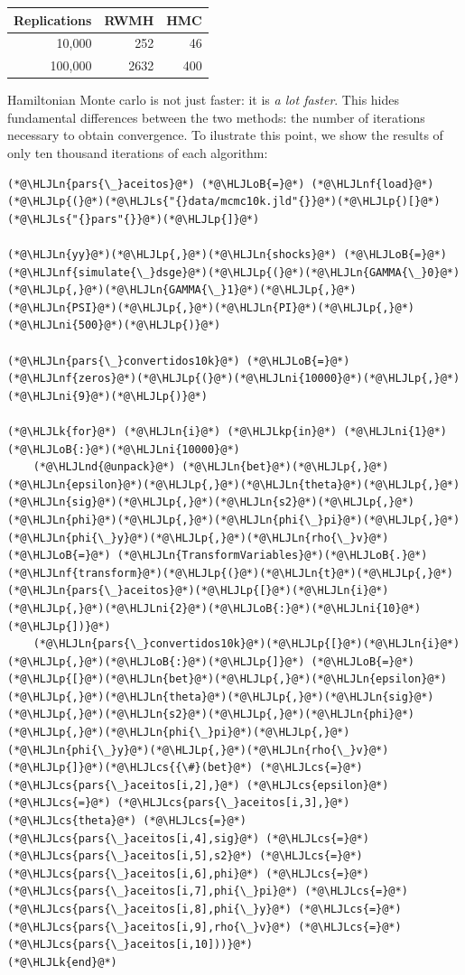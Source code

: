 \documentclass[12pt,a4paper]{article}
\newcommand{\HLJLk}[1]{\textcolor[RGB]{148,91,176}{\textbf{#1}}}
\newcommand{\HLJLkp}[1]{\textcolor[RGB]{148,91,176}{\textbf{#1}}}
\newcommand{\HLJLn}[1]{#1}
\newcommand{\HLJLnd}[1]{\textcolor[RGB]{214,102,97}{#1}}
\newcommand{\HLJLnf}[1]{\textcolor[RGB]{66,102,213}{#1}}
\newcommand{\HLJLs}[1]{\textcolor[RGB]{201,61,57}{#1}}
\newcommand{\HLJLni}[1]{\textcolor[RGB]{59,151,46}{#1}}
\newcommand{\HLJLoB}[1]{\textcolor[RGB]{102,102,102}{\textbf{#1}}}
\newcommand{\HLJLp}[1]{#1}
\newcommand{\HLJLcs}[1]{\textcolor[RGB]{153,153,119}{\textit{#1}}}
\begin{document}
\begin{tabular}
{r | r | r}
Replications & RWMH & HMC \\
\hline
10,000 & 252 & 46 \\
100,000 & 2632 & 400 \\
\end{tabular}
Hamiltonian Monte carlo is not just faster: it is \emph{a lot faster}. This hides fundamental differences between the two methods: the number of iterations necessary to obtain convergence. To ilustrate this point, we show the results of only ten thousand iterations of each algorithm:


\begin{lstlisting}
(*@\HLJLn{pars{\_}aceitos}@*) (*@\HLJLoB{=}@*) (*@\HLJLnf{load}@*)(*@\HLJLp{(}@*)(*@\HLJLs{"{}data/mcmc10k.jld"{}}@*)(*@\HLJLp{)[}@*)(*@\HLJLs{"{}pars"{}}@*)(*@\HLJLp{]}@*)

(*@\HLJLn{yy}@*)(*@\HLJLp{,}@*)(*@\HLJLn{shocks}@*) (*@\HLJLoB{=}@*) (*@\HLJLnf{simulate{\_}dsge}@*)(*@\HLJLp{(}@*)(*@\HLJLn{GAMMA{\_}0}@*)(*@\HLJLp{,}@*)(*@\HLJLn{GAMMA{\_}1}@*)(*@\HLJLp{,}@*)(*@\HLJLn{PSI}@*)(*@\HLJLp{,}@*)(*@\HLJLn{PI}@*)(*@\HLJLp{,}@*)(*@\HLJLni{500}@*)(*@\HLJLp{)}@*)

(*@\HLJLn{pars{\_}convertidos10k}@*) (*@\HLJLoB{=}@*) (*@\HLJLnf{zeros}@*)(*@\HLJLp{(}@*)(*@\HLJLni{10000}@*)(*@\HLJLp{,}@*)(*@\HLJLni{9}@*)(*@\HLJLp{)}@*)

(*@\HLJLk{for}@*) (*@\HLJLn{i}@*) (*@\HLJLkp{in}@*) (*@\HLJLni{1}@*)(*@\HLJLoB{:}@*)(*@\HLJLni{10000}@*)
    (*@\HLJLnd{@unpack}@*) (*@\HLJLn{bet}@*)(*@\HLJLp{,}@*)(*@\HLJLn{epsilon}@*)(*@\HLJLp{,}@*)(*@\HLJLn{theta}@*)(*@\HLJLp{,}@*)(*@\HLJLn{sig}@*)(*@\HLJLp{,}@*)(*@\HLJLn{s2}@*)(*@\HLJLp{,}@*)(*@\HLJLn{phi}@*)(*@\HLJLp{,}@*)(*@\HLJLn{phi{\_}pi}@*)(*@\HLJLp{,}@*)(*@\HLJLn{phi{\_}y}@*)(*@\HLJLp{,}@*)(*@\HLJLn{rho{\_}v}@*) (*@\HLJLoB{=}@*) (*@\HLJLn{TransformVariables}@*)(*@\HLJLoB{.}@*)(*@\HLJLnf{transform}@*)(*@\HLJLp{(}@*)(*@\HLJLn{t}@*)(*@\HLJLp{,}@*)(*@\HLJLn{pars{\_}aceitos}@*)(*@\HLJLp{[}@*)(*@\HLJLn{i}@*)(*@\HLJLp{,}@*)(*@\HLJLni{2}@*)(*@\HLJLoB{:}@*)(*@\HLJLni{10}@*)(*@\HLJLp{])}@*)
    (*@\HLJLn{pars{\_}convertidos10k}@*)(*@\HLJLp{[}@*)(*@\HLJLn{i}@*)(*@\HLJLp{,}@*)(*@\HLJLoB{:}@*)(*@\HLJLp{]}@*) (*@\HLJLoB{=}@*) (*@\HLJLp{[}@*)(*@\HLJLn{bet}@*)(*@\HLJLp{,}@*)(*@\HLJLn{epsilon}@*)(*@\HLJLp{,}@*)(*@\HLJLn{theta}@*)(*@\HLJLp{,}@*)(*@\HLJLn{sig}@*)(*@\HLJLp{,}@*)(*@\HLJLn{s2}@*)(*@\HLJLp{,}@*)(*@\HLJLn{phi}@*)(*@\HLJLp{,}@*)(*@\HLJLn{phi{\_}pi}@*)(*@\HLJLp{,}@*)(*@\HLJLn{phi{\_}y}@*)(*@\HLJLp{,}@*)(*@\HLJLn{rho{\_}v}@*)(*@\HLJLp{]}@*)(*@\HLJLcs{{\#}(bet}@*) (*@\HLJLcs{=}@*) (*@\HLJLcs{pars{\_}aceitos[i,2],}@*) (*@\HLJLcs{epsilon}@*) (*@\HLJLcs{=}@*) (*@\HLJLcs{pars{\_}aceitos[i,3],}@*) (*@\HLJLcs{theta}@*) (*@\HLJLcs{=}@*) (*@\HLJLcs{pars{\_}aceitos[i,4],sig}@*) (*@\HLJLcs{=}@*) (*@\HLJLcs{pars{\_}aceitos[i,5],s2}@*) (*@\HLJLcs{=}@*) (*@\HLJLcs{pars{\_}aceitos[i,6],phi}@*) (*@\HLJLcs{=}@*) (*@\HLJLcs{pars{\_}aceitos[i,7],phi{\_}pi}@*) (*@\HLJLcs{=}@*) (*@\HLJLcs{pars{\_}aceitos[i,8],phi{\_}y}@*) (*@\HLJLcs{=}@*) (*@\HLJLcs{pars{\_}aceitos[i,9],rho{\_}v}@*) (*@\HLJLcs{=}@*) (*@\HLJLcs{pars{\_}aceitos[i,10]))}@*)
(*@\HLJLk{end}@*)


\end{lstlisting}
\end{document}
